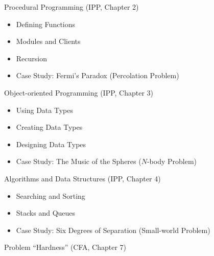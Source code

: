 \documentclass[8pt,a4paper,compress]{beamer}
\begin{document}
\begin{frame}[fragile]
\pause

Procedural Programming (IPP, Chapter 2)
\begin{itemize}
\item Defining Functions
\item Modules and Clients
\item Recursion
\item Case Study: Fermi's Paradox (Percolation Problem)
\end{itemize}

\pause
\bigskip

Object-oriented Programming (IPP, Chapter 3)
\begin{itemize}
\item Using Data Types
\item Creating Data Types
\item Designing Data Types
\item Case Study: The Music of the Spheres ($N$-body Problem)
\end{itemize}

\pause
\bigskip

Algorithms and Data Structures (IPP, Chapter 4)
\begin{itemize}
\item Searching and Sorting
\item Stacks and Queues
\item Case Study: Six Degrees of Separation (Small-world Problem)
\end{itemize}

\pause
\bigskip

Problem ``Hardness'' (CFA, Chapter 7)
\end{frame}
\end{document}
